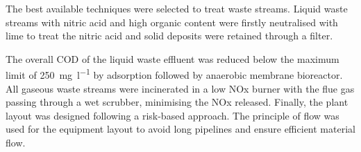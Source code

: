 The best available techniques  were selected to treat waste streams. Liquid waste streams with nitric acid and high organic content were firstly neutralised with lime to treat the nitric acid and solid deposits were retained through a filter. 

The overall COD of the liquid waste effluent was reduced below the maximum limit of \SI{250}{\mg\per\litre} by adsorption followed by anaerobic membrane bioreactor. All gaseous waste streams were incinerated in a low NOx burner with the flue gas passing through a wet scrubber, minimising the NOx released. Finally, the plant layout was designed following a risk-based approach. The principle of flow was used for the equipment layout to avoid long pipelines and ensure efficient material flow. 




